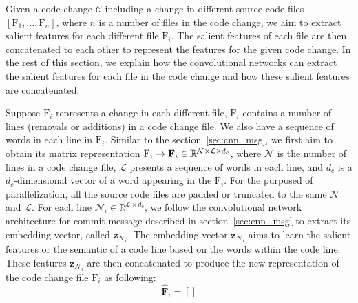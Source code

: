 Given a code change $\mathcal{C}$ including a change in different source code files $[\text{F}_1, \dots, \text{F}_n]$, where $n$ is a number of files in the code change, we aim to extract salient features for each different file $\text{F}_i$. The salient features of each file are then concatenated to each other to represent the features for the given code change. In the rest of this section, we explain how the convolutional networks can extract the salient features for each file in the code change and how these salient features are concatenated. 

Suppose $\text{F}_i$ represents a change in each different file, $\text{F}_i$ contains a number of lines (removals or additions) in a code change file. We also have a sequence of words in each line in $\text{F}_i$. Similar to the section~\ref{sec:cnn_msg}, we first aim to obtain its matrix representation $\text{F}_i \rightarrow \textbf{\text{F}}_i \in \mathbb{R}^{\mathcal{N} \times \mathcal{L} \times{d_c}}$, where $\mathcal{N}$ is the number of lines in a code change file, $\mathcal{L}$ presents a sequence of words in each line, and $d_c$ is a $d_c$-dimensional vector of a word appearing in the $\text{F}_i$. For the purposed of parallelization, all the source code files are padded or truncated to the same $\mathcal{N}$ and $\mathcal{L}$. For each line $\mathcal{N}_i \in \mathbb{R}^{\mathcal{L} \times d_c}$, we follow the convolutional network architecture for commit message described in section~\ref{sec:cnn_msg} to extract its embedding vector, called $\textbf{z}_{\mathcal{N}_i}$. The embedding vector $\textbf{z}_{\mathcal{N}_i}$ aims to learn the salient features or the semantic of a code line based on the words within the code line. These features $\textbf{z}_{\mathcal{N}_i}$ are then concatenated to produce the new representation of the code change file $\text{F}_i$ as following: 
\begin{equation}
\label{eq:concatenate}
\widehat{\textbf{F}}_{i} = []
\end{equation}


